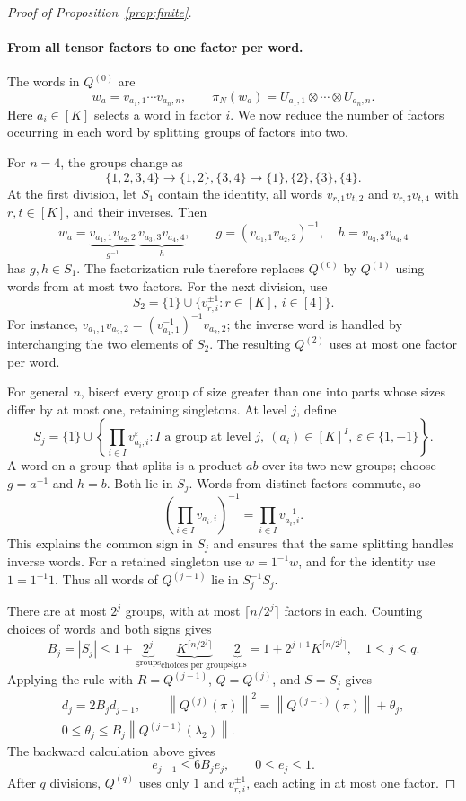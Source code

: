 \documentclass[11pt]{article}
\numberwithin{equation}{section}
\theoremstyle{boldremark}\newtheorem{remark}[theorem]{Remark}
\newcommand{\norm}[1]{\left\lVert #1\right\rVert}
\begin{document}
\begin{proof}[Proof of Proposition~\ref{prop:finite}]
\paragraph{From all tensor factors to one factor per word.}
The words in $Q^{(0)}$ are
\[
 w_a=v_{a_1,1}\cdots v_{a_n,n},\qquad
 \pi_N(w_a)=U_{a_1,1}\otimes\cdots\otimes U_{a_n,n}.
\]
Here $a_i\in[K]$ selects a word in factor $i$.
We now reduce the number of factors occurring in each word by
splitting groups of factors into two.

For $n=4$, the groups change as
\[
 \{1,2,3,4\}
 \longrightarrow\{1,2\},\{3,4\}
 \longrightarrow\{1\},\{2\},\{3\},\{4\}.
\]
At the first division, let $S_1$ contain the identity, all words
$v_{r,1}v_{t,2}$ and $v_{r,3}v_{t,4}$ with $r,t\in[K]$, and their
inverses. Then
\[
 w_a=
 \underbrace{v_{a_1,1}v_{a_2,2}}_{g^{-1}}\,
 \underbrace{v_{a_3,3}v_{a_4,4}}_{h},
 \qquad
 g=(v_{a_1,1}v_{a_2,2})^{-1},\quad
 h=v_{a_3,3}v_{a_4,4}
\]
has $g,h\in S_1$. The factorization rule therefore replaces
$Q^{(0)}$ by $Q^{(1)}$ using words from at most two factors.
For the next division, use
\[
 S_2=\{1\}\cup\{v_{r,i}^{\pm1}:r\in[K],\ i\in[4]\}.
\]
For instance,
$v_{a_1,1}v_{a_2,2}=(v_{a_1,1}^{-1})^{-1}v_{a_2,2}$;
the inverse word is handled by interchanging the two elements of
$S_2$. The resulting $Q^{(2)}$ uses at most one factor per word.

For general $n$, bisect every group of size greater than one into
parts whose sizes differ by at most one, retaining singletons.
At level $j$, define
\[
 S_j=\{1\}\cup
 \left\{\prod_{i\in I}v_{a_i,i}^{\varepsilon}:
 I\text{ a group at level }j,\ (a_i)\in[K]^I,\
 \varepsilon\in\{1,-1\}\right\}.
\]
A word on a group that splits is a product $ab$ over its two new
groups; choose $g=a^{-1}$ and $h=b$. Both lie in $S_j$.
Words from distinct factors commute, so
\[
 \left(\prod_{i\in I}v_{a_i,i}\right)^{-1}
 =\prod_{i\in I}v_{a_i,i}^{-1}.
\]
This explains the common sign in $S_j$ and ensures that the same
splitting handles inverse words. For a retained singleton use
$w=1^{-1}w$, and for the identity use $1=1^{-1}1$.
Thus all words of $Q^{(j-1)}$ lie in $S_j^{-1}S_j$.

There are at most $2^j$ groups, with at most $\lceil n/2^j\rceil$
factors in each. Counting choices of words and both signs gives
\begin{equation}
 B_j=|S_j|
 \le1+\underbrace{2^j}_{\text{groups}}
       \underbrace{K^{\lceil n/2^j\rceil}}_{\text{choices per group}}
       \underbrace{2}_{\text{signs}}
 =1+2^{j+1}K^{\lceil n/2^j\rceil},
 \quad 1\le j\le q.
 \label{eq:coordinate-support}
\end{equation}
Applying the rule with $R=Q^{(j-1)}$, $Q=Q^{(j)}$, and $S=S_j$
gives
\[
 \begin{gathered}
 d_j=2B_jd_{j-1},\qquad
 \norm{Q^{(j)}(\pi)}^2
     =\norm{Q^{(j-1)}(\pi)}+\theta_j,\\
 0\le\theta_j\le B_j\norm{Q^{(j-1)}(\lambda_2)}.
 \end{gathered}
\]
The backward calculation above gives
\[
 e_{j-1}\le6B_je_j,\qquad 0\le e_j\le1.
\]
After $q$ divisions, $Q^{(q)}$ uses only
$1$ and $v_{r,i}^{\pm1}$, each acting in at most one factor.


\end{proof}
\end{document}
